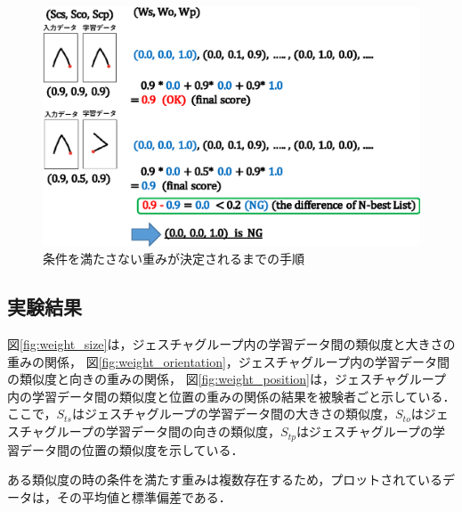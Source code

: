 \begin{figure} [h!]
	\begin{center}
		\includegraphics [width=0.8\hsize ]{img/weight_method1.eps}
	\end{center}
	\caption{条件を満たさない重みが決定されるまでの手順}
	\label{fig:weight_method2}
\end{figure}

\clearpage
\subsection{実験結果}

図\ref{fig:weight_size}は，ジェスチャグループ内の学習データ間の類似度と大きさの重みの関係，
図\ref{fig:weight_orientation}，ジェスチャグループ内の学習データ間の類似度と向きの重みの関係，
図\ref{fig:weight_position}は，ジェスチャグループ内の学習データ間の類似度と位置の重みの関係の結果を被験者ごと示している．
ここで，$S_\textit{ts}$はジェスチャグループの学習データ間の大きさの類似度，$S_\textit{to}$はジェスチャグループの学習データ間の向きの類似度，$S_\textit{tp}$はジェスチャグループの学習データ間の位置の類似度を示している．

ある類似度の時の条件を満たす重みは複数存在するため，プロットされているデータは，その平均値と標準偏差である．

